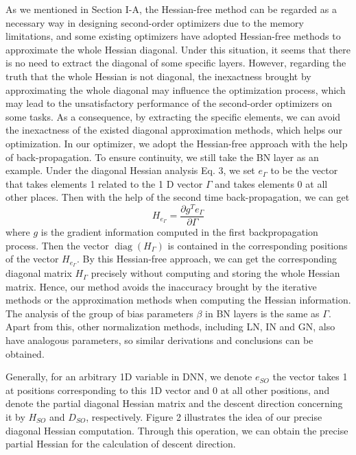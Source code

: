 \documentclass[conference]{IEEEtran}
\begin{document}
As we mentioned in Section I-A, the Hessian-free method can be regarded as a necessary way in designing second-order optimizers due to the memory limitations, and some existing optimizers have adopted Hessian-free methods to approximate the whole Hessian diagonal. Under this situation, it seems that there is no need to extract the diagonal of some specific layers. However, regarding the truth that the whole Hessian is not diagonal, the inexactness brought by approximating the whole diagonal may influence the optimization process, which may lead to the unsatisfactory performance of the second-order optimizers on some tasks. As a consequence, by extracting the specific elements, we can avoid the inexactness of the existed diagonal approximation methods, which helps our optimization. In our optimizer, we adopt the Hessian-free approach with the help of back-propagation. To ensure continuity, we still take the BN layer as an example. Under the diagonal Hessian analysis Eq. 3, we set $e_{\Gamma}$ to be the vector that takes elements 1 related to the 1 D vector $\Gamma$ and takes elements 0 at all other places. Then with the help of the second time back-propagation, we can get
%
\begin{equation*}
H_{e_{\Gamma}}=\frac{\partial g^{T} e_{\Gamma}}{\partial \Gamma} \tag{4}
\end{equation*}
%
where $g$ is the gradient information computed in the first backpropagation process. Then the vector $\operatorname{diag}\left(H_{\Gamma}\right)$ is contained in the corresponding positions of the vector $H_{e_{\Gamma}}$. By this Hessian-free approach, we can get the corresponding diagonal matrix $H_{\Gamma}$ precisely without computing and storing the whole Hessian matrix. Hence, our method avoids the inaccuracy brought by the iterative methods or the approximation methods when computing the Hessian information. The analysis of the group of bias parameters $\beta$ in BN layers is the same as $\Gamma$. Apart from this, other normalization methods, including LN, IN and GN, also have analogous parameters, so similar derivations and conclusions can be obtained.

Generally, for an arbitrary 1D variable in DNN, we denote $e_{S O}$ the vector takes 1 at positions corresponding to this 1D vector and 0 at all other positions, and denote the partial diagonal Hessian matrix and the descent direction concerning it by $H_{S O}$ and $D_{S O}$, respectively. Figure 2 illustrates the idea of our precise diagonal Hessian computation. Through this operation, we can obtain the precise partial Hessian for the calculation of descent direction.
\end{document}
